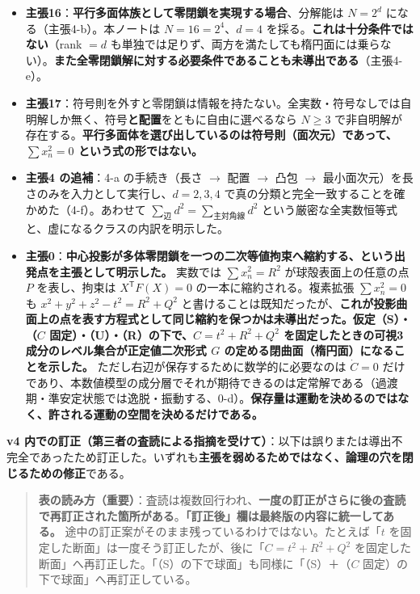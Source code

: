 \documentclass[
  10pt,
]{ltjsarticle}
\providecommand{\tightlist}{%
  \setlength{\itemsep}{0pt}\setlength{\parskip}{0pt}}
\begin{document}
\begin{itemize}
\tightlist
\item
  \textbf{主張16}：\textbf{平行多面体族として零閉鎖を実現する場合}、分解能は
  \(N = 2^d\) になる（主張4-b）。本ノートは \(N = 16 = 2^4\)、\(d = 4\)
  を採る。\textbf{これは十分条件ではない}（rank \(= d\)
  も単独では足りず、両方を満たしても楕円面には乗らない）。\textbf{また全零閉鎖解に対する必要条件であることも未導出である}（主張4-e）。
\item
  \textbf{主張17}：符号則を外すと零閉鎖は情報を持たない。全実数・符号なしでは自明解しか無く、符号\textbf{と配置}をともに自由に選べるなら
  \(N\ge3\)
  で非自明解が存在する。\textbf{平行多面体を選び出しているのは符号則（面次元）であって、\(\sum x_n^2=0\)
  という式の形ではない。}
\item
  \textbf{主張4 の追補}：4-a の手続き（長さ \(\to\) 配置 \(\to\) 凸包
  \(\to\) 最小面次元）を長さのみを入力として実行し、\(d=2,3,4\)
  で真の分類と完全一致することを確かめた（4-f）。あわせて
  \(\sum_{辺}d^2 = \sum_{主対角線}d^2\)
  という厳密な全実数恒等式と、虚になるクラスの内訳を明示した。
\item
  \textbf{主張0}：\textbf{中心投影が多体零閉鎖を一つの二次等値拘束へ縮約する、という出発点を主張として明示した。}
  実数では \(\sum x_n^2 = R^2\) が球殻表面上の任意の点 \(P\)
  を表し、拘束は \(X^{\mathsf T}F(X)=0\) の一本に縮約される。複素拡張
  \(\sum x_n^2 = 0\) も \(x^2+y^2+z^2-t^2 = R^2+Q^2\)
  と書けることは既知だったが、\textbf{これが投影曲面上の点を表す方程式として同じ縮約を保つかは未導出だった。仮定（S）・（\(C\)
  固定）・（U）・（R）の下で、\(C = t^2+R^2+Q^2\)
  を固定したときの可視3成分のレベル集合が正定値二次形式 \(G\)
  の定める閉曲面（楕円面）になることを示した。}
  ただし右辺が保存するために数学的に必要なのは \(\dot C=0\)
  だけであり、本数値模型の成分層でそれが期待できるのは定常解である（過渡期・準安定状態では逸脱・振動する、0-d）。\textbf{保存量は運動を決めるのではなく、許される運動の空間を決めるだけである。}
\end{itemize}

\textbf{v4
内での訂正（第三者の査読による指摘を受けて）}：以下は誤りまたは導出不完全であったため訂正した。いずれも\textbf{主張を弱めるためではなく、論理の穴を閉じるための修正}である。

\begin{quote}
\textbf{表の読み方（重要）}：査読は複数回行われ、\textbf{一度の訂正がさらに後の査読で再訂正された箇所がある}。\textbf{「訂正後」欄は最終版の内容に統一してある。}
途中の訂正案がそのまま残っているわけではない。たとえば「\(t\)
を固定した断面」は一度そう訂正したが、後に「\(C=t^2+R^2+Q^2\)
を固定した断面」へ再訂正した。「（S）の下で球面」も同様に「（S）＋（\(C\)
固定）の下で球面」へ再訂正している。
\end{quote}
\end{document}
